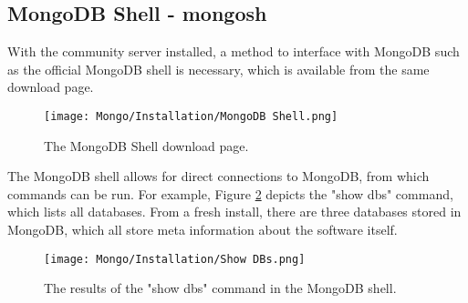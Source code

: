 \subsection{MongoDB Shell - mongosh}

\noindent With the community server installed, a method to interface with MongoDB such as the official 
MongoDB shell is necessary, which is available from the same download page.

\begin{figure}[H]
    \centering
    \texttt{[image: Mongo/Installation/MongoDB Shell.png]}
    \caption{The MongoDB Shell download page.\label{fig:MongoShellDownload}}
\end{figure}


\noindent The MongoDB shell allows for direct connections to MongoDB, from which commands can be run. For example, Figure \ref{fig:ShowDBs} 
depicts the "show dbs" command, which lists all databases. From a fresh install, there are three databases stored in MongoDB,
which all store meta information about the software itself.

\begin{figure}[H]
    \centering
    \texttt{[image: Mongo/Installation/Show DBs.png]}
    \caption{The results of the "show dbs" command in the MongoDB shell.\label{fig:ShowDBs}}
\end{figure}


\endgroup